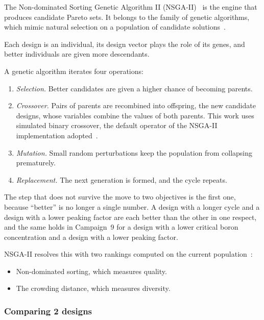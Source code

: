 The Non-dominated Sorting Genetic Algorithm II
(NSGA-II)~\cite{deb_nsga2_2002} is the engine that produces candidate
Pareto sets. It belongs to the family of genetic algorithms, which
mimic natural selection on a population of candidate
solutions~\cite{deb_2001}.

Each design is an individual, its design vector plays the role of its
genes, and better individuals are given more descendants.

A genetic algorithm iterates four operations:

\begin{enumerate}
  \item \emph{Selection.} Better candidates are given a higher chance
        of becoming parents.

  \item \emph{Crossover.} Pairs of parents are recombined into
        offspring, the new candidate designs, whose variables combine the
        values of both parents. This work uses simulated binary
        crossover, the default operator of the NSGA-II implementation
        adopted~\cite{deb_2001,blank_deb_2020}.

  \item \emph{Mutation.} Small random perturbations keep the population
        from collapsing prematurely.

  \item \emph{Replacement.} The next generation is formed, and the cycle
        repeats.
\end{enumerate}

The step that does not survive the move to two objectives is the first
one, because ``better'' is no longer a single number. A design with a
longer cycle and a design with a lower peaking factor are each better
than the other in one respect, and the same holds in Campaign~9 for a
design with a lower critical boron concentration and a design with a
lower peaking factor.

NSGA-II resolves this with two rankings computed on the current
population~\cite{deb_nsga2_2002,deb_2001}:

\begin{itemize}
  \item Non-dominated sorting, which measures quality.

  \item The crowding distance, which measures diversity.
\end{itemize}

\subsubsection*{Comparing 2 designs}

